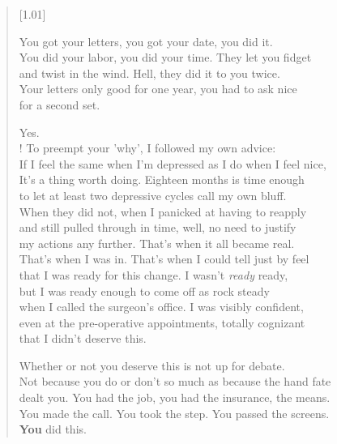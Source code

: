 \begin{verse}[1.01\textwidth]
\begin{ally}
  \noindent You got your letters, you got your date, you did it.\\
  \noindent You did your labor, you did your time. They let you fidget\\
  \noindent and twist in the wind. Hell, they did it to you twice.\\
  \noindent Your letters only good for one year, you had to ask nice\\
  \noindent for a second set.
\end{ally}

  Yes.\\!
   To preempt your 'why', I followed my own advice:\\
  If I feel the same when I'm depressed as I do when I feel nice,\\
  It's a thing worth doing. Eighteen months is time enough\\
  to let at least two depressive cycles call my own bluff.\\
  When they did not, when I panicked at having to reapply\\
  and still pulled through in time, well, no need to justify\\
  my actions any further. That's when it all became real.\\
  That's when I was in. That's when I could tell just by feel\\
  that I was ready for this change. I wasn't \emph{ready} ready,\\
  but I was ready enough to come off as rock steady\\
  when I called the surgeon's office. I was visibly confident,\\
  even at the pre-operative appointments, totally cognizant\\
  that I didn't deserve this.

\begin{ally}
  \noindent Whether or not you deserve this is not up for debate.\\
  \noindent Not because you do or don't so much as because the hand fate\\
  \noindent dealt you. You had the job, you had the insurance, the means.\\
  \noindent You made the call. You took the step. You passed the screens.\\
  \noindent \textbf{You} did this.
\end{ally}
\end{verse}
\newpage

